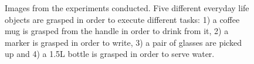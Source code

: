 \begin{figure}[ht!]
\centering
{}
\caption{Images from the experiments conducted. Five different everyday life objects are grasped in order to execute different tasks: 1) a coffee mug is grasped from the handle in order to drink from it, 2) a marker is grasped in order to write, 3) a pair of glasses are picked up and 4) a 1.5L bottle is grasped in order to serve water.} 
\label{Experiments}
\end{figure} 

\newpage
